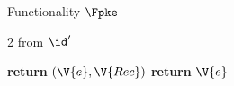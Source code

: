 \begin{interface}[nofloat]{Functionality $\Fpke$ \\
}
{\begin{multicols}{2}
 \quad from $\id'$
\begin{algorithmic}[1]
\algcont
{}
  \State \textbf{return} $(\V{e}, \V{Rec})$ \label{ln:pkeleakowner}
\EndIf
\State \textbf{return} $\V{e}$ \label{ln:pkeleakother}
\algsave
\end{algorithmic}
\end{multicols}}
\end{interface}
